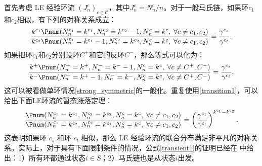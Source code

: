 首先考虑 LE 经验环流 $(J^c_n)_{c\in\mathcal{C}}$，其中$J_n^c=N_n^c/n$。对于一般马氏链，如果环$c_1$和$c_2$相似，有下列的对称关系成立：
\begin{equation}\label{transient1}
    \frac{k^{c_1} \Pnum(N^{c_1}_n=k^{c_1},N^{c_2}_n=k^{c_2}-1,N^{c}_n=k^{c},\;\forall c\neq c_1,c_2)}
    {k^{c_2} \Pnum(N^{c_1}_n=k^{c_1} -1,N^{c_2}_n=k^{c_2},N^{c}_n=k^{c},\;\forall c\neq c_1,c_2)}
    = \frac{\gamma^{c_s}}{\gamma^{c_t}}.
\end{equation}
如果把环$c_1$和$c_2$分别设环$C^+$和它的反环$C^-$，那么等式可以化为：
\begin{equation*}
    \frac{k^{+} \Pnum(N^{+}_n=k^{+},N^{-}_n=k^{-}-1,N^{c}_n=k^{c},\;\forall c\neq C^+,C^-)}
    {k^{-} \Pnum(N^{+}_n=k^{+} -1,N^{-}_n=k^{-},N^{c}_n=k^{c},\;\forall c\neq C^+,C^-)}
    = \frac{\gamma^{c_s}}{\gamma^{c_t}}.
\end{equation*}
这可以被看做单环情况\ref{strong_symmetric}的一般化。重复使用\ref{transition1}，可以给出下面LE环流的暂态涨落定理：
\begin{equation}\label{transient2}
    \frac{\Pnum(N^{c_1}_n=k^{c_1},N^{c_2}_n=k^{c_2},N^{c}_n=k^{c},\;\forall c\neq c_1,c_2)}
    {\Pnum(N^{c_1}_n=k^{c_2},N^{c_2}_n=k^{c_1},N^{c}_n=k^{c},\;\forall c\neq c_1,c_2)}
    = \left(\frac{\gamma^{c_1}}{\gamma^{c_t}}\right)^{k^{c_1}-k^{c_2}}.
\end{equation}
这表明如果环 $c_s$ 和环 $c_t$ 相似，那么 LE 经验环流的联合分布满足非平凡的对称关系。实际上，对于具有下面限制条件的情况，公式\ref{transient1}的证明已经在 \cite{jia2016cycle}中给出：1）所有环都通过状态$i\in S$；2）马氏链也是从状态$i$出发。


